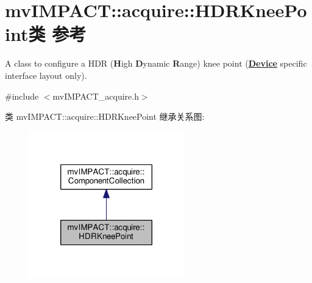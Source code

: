 \hypertarget{classmv_i_m_p_a_c_t_1_1acquire_1_1_h_d_r_knee_point}{\section{mv\+I\+M\+P\+A\+C\+T\+:\+:acquire\+:\+:H\+D\+R\+Knee\+Point类 参考}
\label{classmv_i_m_p_a_c_t_1_1acquire_1_1_h_d_r_knee_point}
}


A class to configure a H\+D\+R ({\bfseries H}igh {\bfseries D}ynamic {\bfseries R}ange) knee point ({\bfseries \hyperlink{classmv_i_m_p_a_c_t_1_1acquire_1_1_device}{Device}} specific interface layout only).  




{\ttfamily \#include $<$mv\+I\+M\+P\+A\+C\+T\+\_\+acquire.\+h$>$}



类 mv\+I\+M\+P\+A\+C\+T\+:\+:acquire\+:\+:H\+D\+R\+Knee\+Point 继承关系图\+:
\nopagebreak
\begin{figure}[H]
\begin{center}
\leavevmode
\includegraphics[width=190pt]{classmv_i_m_p_a_c_t_1_1acquire_1_1_h_d_r_knee_point__inherit__graph}
\end{center}
\end{figure}


